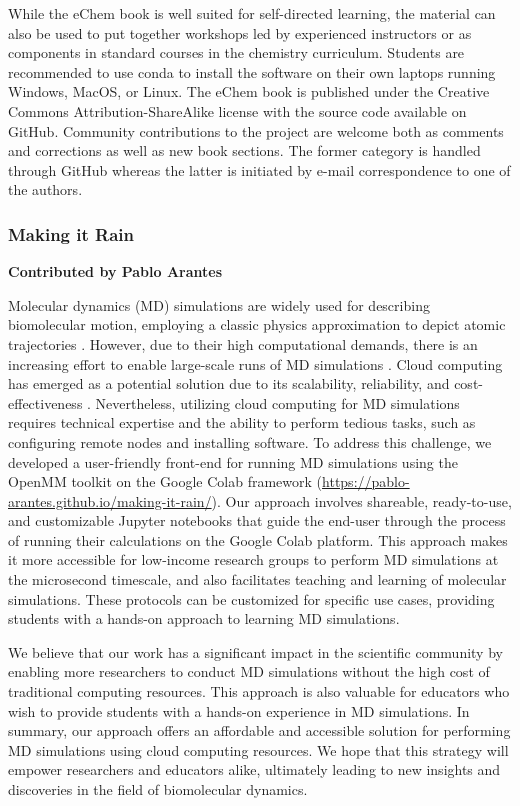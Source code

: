 \documentclass[9pt,review]{livecoms}
\begin{document}
While the eChem book is well suited for self-directed learning, the material can also be used to put together workshops led by experienced instructors or as components in standard courses in the chemistry curriculum.  Students are recommended to use conda to install the software on their own laptops running Windows, MacOS, or Linux. 
The eChem book is published under the Creative Commons Attribution-ShareAlike license with the source code available on GitHub.  Community contributions to the project are welcome both as comments and corrections as well as new book sections. The former category is handled through GitHub whereas the latter is initiated by e-mail correspondence to one of the authors.

\subsubsection{Making it Rain}

\textbf{Contributed by Pablo Arantes}

Molecular dynamics (MD) simulations are widely used for describing biomolecular motion, employing a classic physics approximation to depict atomic trajectories \cite{Liu2017,Hollingsworth2018}. However, due to their high computational demands, there is an increasing effort to enable large-scale runs of MD simulations \cite{Hollingsworth2018}. Cloud computing has emerged as a potential solution due to its scalability, reliability, and cost-effectiveness \cite{Ebejer2013}. Nevertheless, utilizing cloud computing for MD simulations requires technical expertise and the ability to perform tedious tasks, such as configuring remote nodes and installing software. To address this challenge, we developed a user-friendly front-end for running MD simulations \cite{Arantes2021} using the OpenMM toolkit \cite{Eastman2017} on the Google Colab framework \cite{colab,Bisong2019} (\url{https://pablo-arantes.github.io/making-it-rain/}). Our approach involves shareable, ready-to-use, and customizable Jupyter notebooks that guide the end-user through the process of running their calculations on the Google Colab platform. This approach makes it more accessible for low-income research groups to perform MD simulations at the microsecond timescale, and also facilitates teaching and learning of molecular simulations. These protocols can be customized for specific use cases, providing students with a hands-on approach to learning MD simulations.

We believe that our work has a significant impact in the scientific community by enabling more researchers to conduct MD simulations without the high cost of traditional computing resources. This approach is also valuable for educators who wish to provide students with a hands-on experience in MD simulations. In summary, our approach offers an affordable and accessible solution for performing MD simulations using cloud computing resources. We hope that this strategy will empower researchers and educators alike, ultimately leading to new insights and discoveries in the field of biomolecular dynamics.
\end{document}
